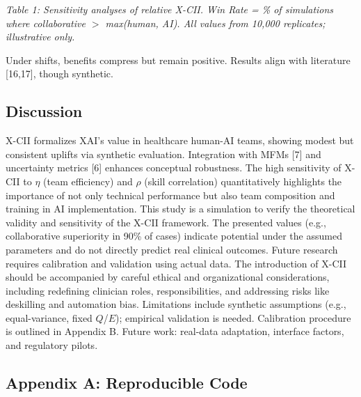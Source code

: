 \documentclass[a4paper]{article}
\begin{document}
\emph{Table 1: Sensitivity analyses of relative X-CII. Win Rate = \% of
simulations where collaborative $>$ max(human, AI). All
values from 10,000 replicates; illustrative only.}

Under shifts, benefits compress but remain positive. Results align with
literature {[}16,17{]}, though synthetic.

\subsection{Discussion}\label{discussion}

X-CII formalizes XAI's value in healthcare human-AI teams, showing
modest but consistent uplifts via synthetic evaluation. Integration with
MFMs {[}7{]} and uncertainty metrics {[}6{]} enhances conceptual
robustness. The high sensitivity of X-CII to $\eta$ (team efficiency) and $\rho$
(skill correlation) quantitatively highlights the importance of not only
technical performance but also team composition and training in AI
implementation. This study is a simulation to verify the theoretical
validity and sensitivity of the X-CII framework. The presented values
(e.g., collaborative superiority in 90\% of cases) indicate potential
under the assumed parameters and do not directly predict real clinical
outcomes. Future research requires calibration and validation using
actual data. The introduction of X-CII should be accompanied by careful
ethical and organizational considerations, including redefining
clinician roles, responsibilities, and addressing risks like deskilling
and automation bias. Limitations include synthetic assumptions (e.g.,
equal-variance, fixed $Q$/$E$); empirical validation is needed. Calibration
procedure is outlined in Appendix B. Future work: real-data adaptation,
interface factors, and regulatory pilots.

\subsection{Appendix A: Reproducible
Code}\label{appendix-a-reproducible-code}
\end{document}
